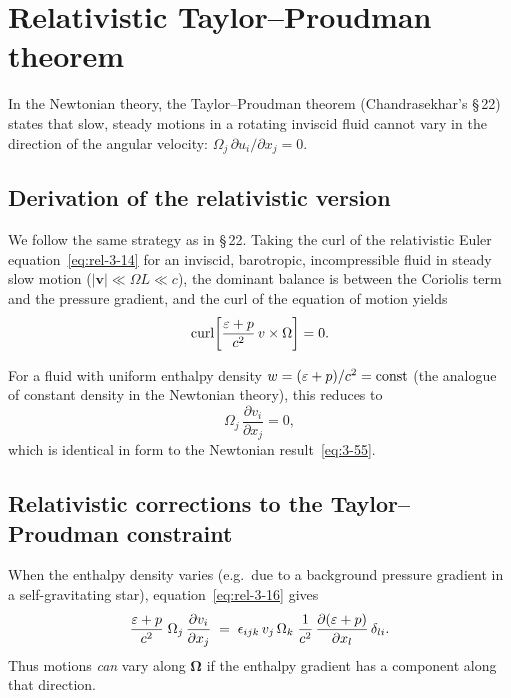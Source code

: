 \section{Relativistic Taylor--Proudman theorem}\label{sec:rel-3-22}

In the Newtonian theory, the Taylor--Proudman theorem
(Chandrasekhar's \S\,22) states that slow, steady motions in a
rotating inviscid fluid cannot vary in the direction of the angular
velocity: $\Omega_{j}\,\partial u_{i}/\partial x_{j} = 0$.

\subsection{Derivation of the relativistic version}

We follow the same strategy as in \S\,22.  Taking the curl of the
relativistic Euler equation~\eqref{eq:rel-3-14} for an inviscid,
barotropic, incompressible fluid in steady slow motion
($|\mathbf{v}| \ll \Omega L \ll c$), the dominant balance is between
the Coriolis term and the pressure gradient, and the curl of the
equation of motion yields
\begin{equation}\label{eq:rel-3-16}
  \operatorname{curl}
  \!\left[
  \frac{\varepsilon + p}{c^{2}}\,
  v\times\Omega
  \right]
  = 0.
\end{equation}

For a fluid with uniform enthalpy density
$w = (\varepsilon + p)/c^{2} = \text{const}$ (the analogue of
constant density in the Newtonian theory), this reduces to
\begin{equation}\label{eq:rel-3-17}
  \Omega_{j}\,\frac{\partial v_{i}}{\partial x_{j}} = 0,
\end{equation}
which is identical in form to the Newtonian result~\eqref{eq:3-55}.

\subsection{Relativistic corrections to the Taylor--Proudman constraint}

When the enthalpy density varies (e.g.\ due to a background pressure
gradient in a self-gravitating star), equation~\eqref{eq:rel-3-16}
gives
\begin{equation}\label{eq:rel-3-18}
  \frac{\varepsilon + p}{c^{2}}\;
  \Omega_{j}\,\frac{\partial v_{i}}{\partial x_{j}}
  \;=\;
  \epsilon_{ijk}\,v_{j}\,\Omega_{k}\;
  \frac{1}{c^{2}}\,
  \frac{\partial(\varepsilon + p)}{\partial x_{l}}\,\delta_{li}.
\end{equation}
Thus motions \emph{can} vary along $\boldsymbol{\Omega}$ if the
enthalpy gradient has a component along that direction.

